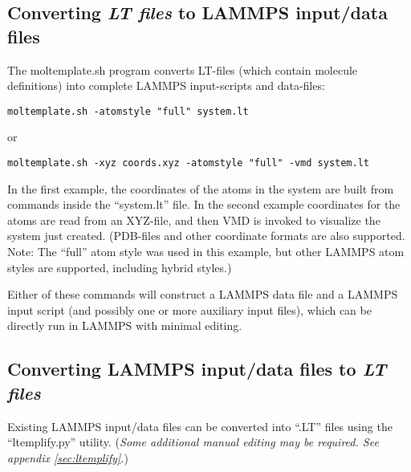 \documentclass[11pt]{article}
\begin{document}
%
%

\subsection{Converting \textit{LT files} to LAMMPS input/data files}
The moltemplate.sh program converts LT-files (which contain 
molecule definitions) into complete LAMMPS input-scripts and data-files:
\begin{verbatim}
moltemplate.sh -atomstyle "full" system.lt
\end{verbatim}
     or
\begin{verbatim}
moltemplate.sh -xyz coords.xyz -atomstyle "full" -vmd system.lt
\end{verbatim}
In the first example, the coordinates of the atoms in the 
system are built from commands inside the ``system.lt'' file.
In the second example coordinates for the atoms are read from an XYZ-file,
and then VMD is invoked to visualize the system just created. 
(PDB-files and other coordinate formats are also supported.
Note: The ``full'' atom style was used in this example, but other
LAMMPS atom styles are supported, including hybrid styles.)

Either of these commands will construct a LAMMPS data file and a 
LAMMPS input script (and possibly one or more auxiliary input files),
which can be directly run in LAMMPS with minimal editing.


\subsection{Converting LAMMPS input/data files to \textit{LT files}}
Existing LAMMPS input/data files can be converted into 
``.LT'' files using the ``ltemplify.py'' utility. 
(\textit{Some additional manual editing may be required. 
 See appendix \ref{sec:ltemplify}.})
\end{document}

